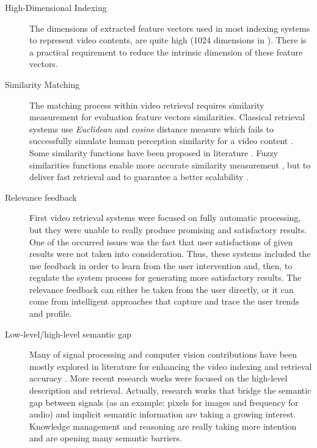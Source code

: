 	\begin{description}
		\item[High-Dimensional Indexing] 
		The dimensions of extracted feature vectors used in most indexing systems to represent 
		video contents, are quite high (1024 dimensions in \citep{Elleuch2015}). There is a practical 
		requirement to reduce the intrinsic dimension of these feature vectors.
	
		\item[Similarity Matching] 
		The matching process within video retrieval requires similarity measurement for evaluation 
		feature vectors similarities. Classical retrieval systems use \emph{Euclidean} and \emph{cosine} 
		distance measure which fails to successfully simulate human perception similarity for a video content 
		\citep{Juneja2015}. Some similarity functions have been proposed in literature \citep{Shen2011}.
		Fuzzy similarities functions 
		enable more accurate similarity measurement \citep{Chen2002,Chaira2005,Baccour2013,Baccour2014,Kraft2015}, 
		but  to deliver fast retrieval and to guarantee a better scalability \citep{Shen2011}.
		
		\item[Relevance feedback]
		First video retrieval systems were focused on fully automatic processing, 
		but they were unable to really produce promising and satisfactory results. 
		One of the occurred issues was the fact that user satisfactions of given results 
		were not taken into consideration. Thus, these systems included the use feedback 
		in order to learn from the user intervention and, then, to regulate the system process 
		for generating more satisfactory results. The relevance feedback can either be taken from the
		user directly, or it can come from intelligent approaches that capture and trace the user trends and profile.
		
		\item[Low-level/high-level semantic gap]
		Many of signal processing and computer vision contributions have been mostly explored in literature 
		for enhancing the video indexing and retrieval accuracy \citep{Brunelli1999,Liu2007}.
		More recent research works were focused on the high-level description and retrieval. 
		Actually, research works that bridge the semantic gap between signals (as an example: 
		pixels for images and frequency for audio) and implicit semantic information are taking 
		a growing interest. Knowledge management and reasoning are really taking more intention 
		and are opening many semantic barriers.
		

\end{description}
